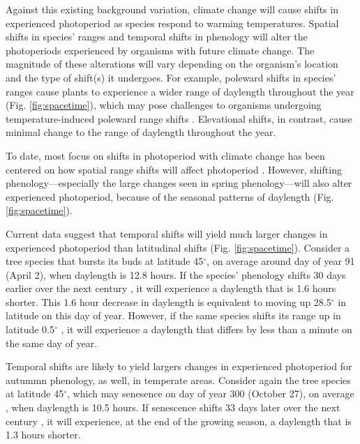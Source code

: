 \documentclass{article}
\begin{document}
\par Against this existing background variation, climate change will cause shifts in experienced photoperiod as species respond to warming temperatures. Spatial shifts in species' ranges and temporal shifts in phenology will alter the photoperiods experienced by organisms with future climate change. The magnitude of these alterations will vary depending on the organism's location and the type of shift(s) it undergoes. For example, poleward shifts in species' ranges cause plants to experience a wider range of daylength throughout the year (Fig. \ref{fig:spacetime}), which may pose challenges to organisms undergoing temperature-induced poleward range shifts \citep{huffeldt2020}. Elevational shifts, in contrast, cause minimal change to the range of daylength throughout the year.

\par To date, most focus on shifts in photoperiod with climate change has been centered on how spatial range shifts will affect photoperiod \citep[e.g.,][]{saikkonen2012,way2015}. However, shifting phenology---especially the large changes seen in spring phenology---will also alter experienced photoperiod, because of the seasonal patterns of daylength (Fig. \ref{fig:spacetime}). 

\par Current data suggest that temporal shifts will yield much larger changes in experienced photoperiod than latitudinal shifts (Fig. \ref{fig:spacetime}).
Consider a tree species that bursts its buds at latitude 45$^{\circ}$, on average around day of year 91 (April 2), when daylength is 12.8 hours. If the species' phenology shifts 30 days earlier over the next century \citep[i.e., a rate of ~3 days per decade, as has been observed,][]{parmesan2003}, it will experience a daylength that is 1.6 hours shorter. This 1.6 hour decrease in daylength is equivalent to moving up 28.5$^{\circ}$ in latitude on this day of year. However, if the same species shifts its range up in latitude 0.5$^{\circ}$ \citep[i.e., 60 km over the next century, comparable to observed rates,][]{chen2011,parmesan2003}, it will experience a daylength that differs by less than a minute on the same day of year. 
\par Temporal shifts are likely to yield largers changes in experienced photoperiod for autummn phenology, as well, in temperate areas. Consider again the tree species at latitude 45$^{\circ}$, which may senesence on day of year 300 (October 27), on average \citep{gill2015}, when daylength is 10.5 hours. If senescence shifts 33 days later over the next century \citep[i.e., a rate of 3.3 days per decade, as has been observed,][]{gill2015}, it will experience, at the end of the growing season, a daylength that is 1.3 hours shorter.
\end{document}
